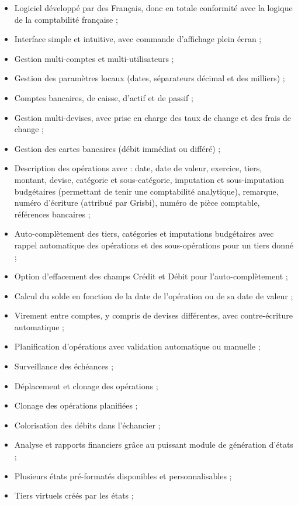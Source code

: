 \begin{itemize}
	\item Logiciel développé par des Français, donc en totale conformité avec la logique de la comptabilité française ;
	\item Interface simple et intuitive, avec commande d'affichage plein écran ;
	\item Gestion multi-comptes et multi-utilisateurs ;
	\item Gestion des paramètres locaux (dates, séparateurs décimal et des milliers) ;	
	\item Comptes bancaires, de caisse, d'actif et de passif ;
	\item Gestion multi-devises, avec prise en charge des taux de change et des frais de change ;
	\item Gestion des cartes bancaires (débit immédiat ou différé) ;	
	\item Description des opérations avec : date, date de valeur, exercice, tiers, montant, devise, catégorie et sous-catégorie, imputation et sous-imputation budgétaires (permettant de tenir une comptabilité analytique), remarque, numéro d'écriture (attribué par Grisbi), numéro de pièce comptable, références bancaires ;
	\item Auto-complètement des tiers, catégories et imputations budgétaires avec rappel automatique des  opérations et des sous-opérations pour un tiers donné ;
	\item Option d'effacement des champs Crédit et Débit pour l'auto-complètement ;
	\item Calcul du solde en fonction de la date de l'opération ou de sa date de valeur ;
	\item Virement entre comptes, y compris de devises différentes, avec contre-écriture automatique ;
	\item Planification d'opérations avec validation automatique ou manuelle ;
	\item Surveillance des échéances ;
	\item Déplacement et clonage des opérations ;
	\item Clonage des opérations planifiées ;
	\item Colorisation des débits dans l'échancier ;
	\item Analyse et rapports financiers grâce au puissant module de génération d'états ;
	\item Plusieurs états pré-formatés disponibles et personnalisables ;
	\item Tiers virtuels créés par les états ;

\end{itemize}
